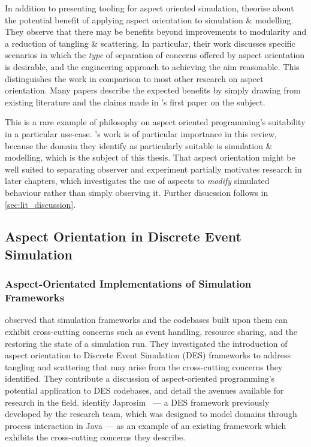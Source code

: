 In addition to presenting tooling for aspect oriented simulation,
\citet{gulyas1999use} theorise about the potential benefit of applying aspect
orientation to simulation \& modelling. They observe that there may be benefits
beyond improvements to modularity and a reduction of tangling \& scattering. In
particular, their work discusses specific scenarios in which the \emph{type} of
separation of concerns offered by aspect orientation is desirable, and the
engineering approach to achieving the aim reasonable.
This distinguishes the work in comparison to most other research on aspect
orientation. Many papers describe the expected benefits by simply drawing from
existing literature and the claims made in \citet{kiczales1997aspect}'s first
paper on the subject.

This is a rare example of philosophy on aspect oriented programming's
suitability in a particular use-case. \citeauthor{gulyas1999use}'s work is of
particular importance in this review, because the domain they identify as
particularly suitable is simulation \& modelling, which is the subject of this
thesis. That aspect orientation might be well suited to separating observer and
experiment partially motivates research in later chapters, which investigates
the use of aspects to \emph{modify} simulated behaviour rather than simply
observing it. Further disucssion follows in \cref{sec:lit_discussion}.



\subsection{Aspect Orientation in Discrete Event Simulation}

\subsubsection{Aspect-Orientated Implementations of Simulation Frameworks}

\citet{chibani2013toward} observed that simulation frameworks and the codebases
built upon them can exhibit cross-cutting concerns such as event handling,
resource sharing, and the restoring the state of a simulation run. They
investigated the introduction of aspect orientation to Discrete Event Simulation
(DES) frameworks to address tangling and scattering that may arise from the
cross-cutting concerns they identified. They contribute a discussion of
aspect-oriented programming's potential application to DES codebases, and detail
the avenues available for research in the field. \citet{chibani2013toward}
identify Japrosim~\cite{abdelhabib2008japrosim,belattar2014yet} --- a DES
framework previously developed by the research team, which was designed to model
domains through process interaction in Java --- as an example of an
existing framework which exhibits the cross-cutting concerns they describe.

